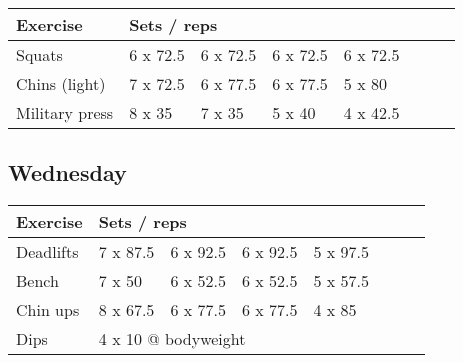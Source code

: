\documentclass[12pt, a4paper]{article}%
\begin{document}
  \begin{tabular}{l|lllllll}
  \hspace{0.75em} \textbf{Exercise} & \multicolumn{ 7 }{l}{ \textbf{Sets / reps} } \\ \hline

            \hspace{0.75em} Squats
            & 6 x 72.5
            & 6 x 72.5
            & 6 x 72.5
            & 6 x 72.5
            & 
            & 
            & 
            \\


            \hspace{0.75em} Chins (light)
            & 7 x 72.5
            & 6 x 77.5
            & 6 x 77.5
            & 5 x 80
            & 
            & 
            & 
            \\


            \hspace{0.75em} Military press
            & 8 x 35
            & 7 x 35
            & 5 x 40
            & 4 x 42.5
            & 
            & 
            & 
            \\


  \end{tabular}

  \subsection*{\hspace{0.5em} Wednesday }


  \begin{tabular}{l|lllllll}
  \hspace{0.75em} \textbf{Exercise} & \multicolumn{ 7 }{l}{ \textbf{Sets / reps} } \\ \hline

            \hspace{0.75em} Deadlifts
            & 7 x 87.5
            & 6 x 92.5
            & 6 x 92.5
            & 5 x 97.5
            & 
            & 
            & 
            \\


            \hspace{0.75em} Bench
            & 7 x 50
            & 6 x 52.5
            & 6 x 52.5
            & 5 x 57.5
            & 
            & 
            & 
            \\


            \hspace{0.75em} Chin ups
            & 8 x 67.5
            & 6 x 77.5
            & 6 x 77.5
            & 4 x 85
            & 
            & 
            & 
            \\


   \hspace{0.75em} Dips &  \multicolumn{ 7 }{l}{ 4 x 10 @ bodyweight } \\
  \end{tabular}
\end{document}
